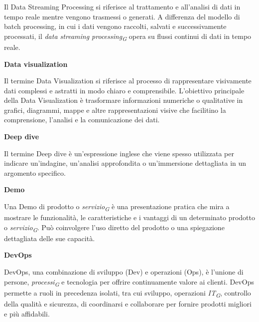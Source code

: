 \documentclass{article}
\begin{document}
Il Data Streaming Processing si riferisce al trattamento e all'analisi di dati in tempo reale mentre vengono trasmessi o generati. A differenza del modello di batch processing, in cui i dati vengono raccolti, salvati e successivamente processati, il \textit{data streaming processing}\textsubscript{\textit{G}} opera su flussi continui di dati in tempo reale.

\vspace{0.4cm}

\textbf{Data visualization}

\vspace{0.1cm}

Il termine Data Visualization si riferisce al processo di rappresentare visivamente dati complessi e astratti in modo chiaro e comprensibile. L'obiettivo principale della Data Visualization è trasformare informazioni numeriche o qualitative in grafici, diagrammi, mappe e altre rappresentazioni visive che facilitino la comprensione, l'analisi e la comunicazione dei dati. 

\vspace{0.4cm}

\textbf{Deep dive}

\vspace{0.1cm}

Il termine Deep dive è un'espressione inglese che viene spesso utilizzata per indicare un'indagine, un'analisi approfondita o un'immersione dettagliata in un argomento specifico.

\vspace{0.4cm}

\textbf{Demo}

\vspace{0.1cm}

Una Demo di prodotto o \textit{servizio}\textsubscript{\textit{G}} è una presentazione pratica che mira a mostrare le funzionalità, le caratteristiche e i vantaggi di un determinato prodotto o \textit{servizio}\textsubscript{\textit{G}}. Può coinvolgere l'uso diretto del prodotto o una spiegazione dettagliata delle sue capacità.

\vspace{0.4cm}

\textbf{DevOps}

\vspace{0.1cm}

DevOps, una combinazione di sviluppo (Dev) e operazioni (Ops), è l'unione di persone, \textit{processi}\textsubscript{\textit{G}} e tecnologia per offrire continuamente valore ai clienti. DevOps permette a ruoli in precedenza isolati, tra cui sviluppo, operazioni \textit{IT}\textsubscript{\textit{G}}, controllo della qualità e sicurezza, di coordinarsi e collaborare per fornire prodotti migliori e più affidabili.
\end{document}
